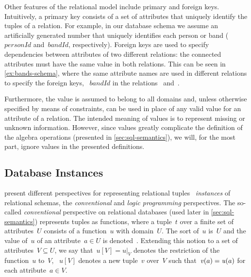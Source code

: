 Other features of the relational model include primary and foreign keys.
%
Intuitively, a primary key consists of a set of attributes that uniquely identify the tuples of a relation.  For
example, in our database schema we assume an artificially generated number that uniquely identifies each person or band
($\mathit{personId}$ and~$\mathit{bandId}$, respectively).
%
Foreign keys are used to specify dependencies between attributes of two different relations: the connected attributes
must have the same value in both relations.  This can be seen in \cref{ex:bands-schema}, where the same attribute
names are used in different relations to specify the foreign keys, \eg~$\mathit{bandId}$ in the
relations~ and~.

%
Furthermore, the \NULL value is assumed to belong to all domains and, unless otherwise specified by means of
constraints, can be used in place of any valid value for an attribute of a relation. The intended meaning of \NULL
values is to represent missing or unknown information.
%
However, since \NULL values greatly complicate the definition of the algebra operations (presented in
\cref{sec:sql-semantics}), we will, for the most part, ignore \NULL values in the presented definitions.



\subsection*{Database Instances}
\label{sec:database-instances}


\citet{AbiteboulHullVianu:1995aa} present different perspectives for representing relational tuples \ie~\emph{instances}
of relational schemas, the \emph{conventional} and \emph{logic programming} perspectives.
%
The so-called \emph{conventional} perspective on relational databases (used later in \cref{sec:sql-semantics})
represents tuples as functions, where a tuple~$t$ over a finite set of attributes~$U$ consists of a function~$u$ with
domain~$U$.
%
The sort of~$u$ is~$U$ and the value of~$u$ of an attribute~$a \in U$ is denoted~.
%
Extending this notion to a set of attributes~$V \subseteq U$, we say that~$u[V] = u|_{V}$ denotes the restriction of the
function~$u$ to~$V$, \ie~$u[V]$ denotes a new tuple~$v$ over~$V$ such that~$\mathit{v}\!\left(a\right) = \mathit{u}\!\left(a\right)$ for each
attribute~$a \in V$.


